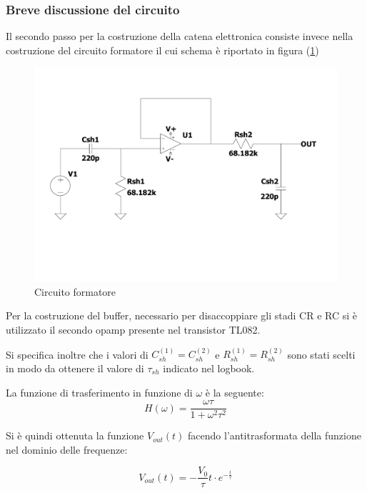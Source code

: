 \documentclass{article}
\begin{document}
\subsubsection{Breve discussione del circuito}

Il secondo passo per la costruzione della catena elettronica consiste invece nella costruzione del circuito formatore il cui schema è riportato
in figura (\ref{fig:shaper})

\begin{center}
    \begin{figure}[H]
    \centering
    \includegraphics[scale=0.1875, angle=0]{shaper.pdf}
    \caption{Circuito formatore}
    \label{fig:shaper}
    \end{figure}
\end{center}


Per la costruzione del buffer, necessario per disaccoppiare gli stadi CR e RC si è utilizzato il secondo opamp presente nel transistor TL082.

Si specifica inoltre che i valori di $C_{sh}^{(1)}=C_{sh}^{(2)}$ e $R_{sh}^{(1)}=R_{sh}^{(2)}$ sono stati scelti in modo da ottenere il valore di $\tau_{sh}$ indicato nel logbook.

La funzione di trasferimento in funzione di $\omega$ è la seguente:
\begin{equation}
H(\omega)=\frac{\omega \tau}{1+\omega^2\tau^2}
\end{equation}

Si è quindi ottenuta la funzione $V_{out}(t)$ facendo l'antitrasformata della funzione nel dominio delle frequenze:

$$    V_{out}(t)= - \frac{V_0}{\tau} t \cdot e^{-\frac{t}{\tau}} $$
\end{document}

